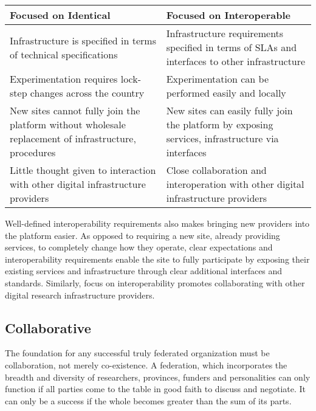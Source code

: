 \documentclass[11pt, letterpaper, twoside]{article}
\begin{document}
\begin{table}[ht] \centering \small {\sffamily
{} \begin{tabular}{P{2.5in}|P{2.5in}}
\textcolor{cdaRed}{\textbf{Focused on Identical}} & \textcolor{cdaRed}{\textbf{Focused on Interoperable}} \\
\hline
\hline 
Infrastructure is specified in terms of technical specifications & Infrastructure requirements specified in terms of SLAs and interfaces to other infrastructure \\
Experimentation requires lock-step changes across the country & Experimentation can be performed easily and locally \\
New sites cannot fully join the platform without wholesale replacement of infrastructure, procedures & New sites can easily fully join the platform by exposing services, infrastructure via interfaces \\ 
Little thought given to interaction with other digital infrastructure providers & Close collaboration and interoperation with other digital infrastructure providers \\
\hline 
\end{tabular}
}
\end{table}


Well-defined interoperability requirements also makes bringing new
providers into the platform easier. As opposed to requiring a new site,
already providing services, to completely change how they operate, clear
expectations and interoperability requirements enable the site to fully
participate by exposing their existing services and infrastructure
through clear additional interfaces and standards. Similarly, focus on
interoperability promotes collaborating with other digital research
infrastructure providers.

\subsection*{Collaborative}
%

The foundation for any successful truly federated organization must be
collaboration, not merely co-existence.  A federation, which incorporates
the breadth and diversity of researchers, provinces, funders and
personalities can only function if all parties come to the table in good
faith to discuss and negotiate. It can only be a success if the whole
becomes greater than the sum of its parts.
\end{document}
